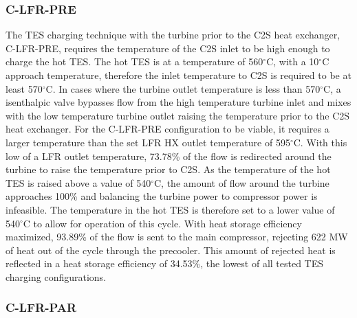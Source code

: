 \begin{paracol}{2}
\linenumbers
\switchcolumn

\subsubsection{C-LFR-PRE}
The TES charging technique with the turbine prior to the C2S heat exchanger, C-LFR-PRE, requires the temperature of the C2S inlet to be high enough to charge the hot TES. The hot TES is at a temperature of 560$^{\circ}$C, with a 10$^{\circ}$C approach temperature, therefore the inlet temperature to C2S is required to be at least 570$^{\circ}$C. In cases where the turbine outlet temperature is less than 570$^{\circ}$C, a isenthalpic valve bypasses flow from the high temperature turbine inlet and mixes with the low temperature turbine outlet raising the temperature prior to the C2S heat exchanger. For the C-LFR-PRE configuration to be viable, it requires a larger temperature than the set LFR HX outlet temperature of 595$^{\circ}$C. With this low of a LFR outlet temperature, 73.78\% of the flow is redirected around the turbine to raise the temperature prior to C2S. As the temperature of the hot TES is raised above a value of 540$^{\circ}$C, the amount of flow around the turbine approaches 100\% and balancing the turbine power to compressor power is infeasible. The temperature in the hot TES is therefore set to a lower value of 540$^{\circ}$C to allow for operation of this cycle. With heat storage efficiency maximized, 93.89\% of the flow is sent to the main compressor, rejecting 622 MW of heat out of the cycle through the precooler. This amount of rejected heat is reflected in a heat storage efficiency of 34.53\%, the lowest of all tested TES charging configurations.

\subsubsection{C-LFR-PAR}


\end{paracol}
